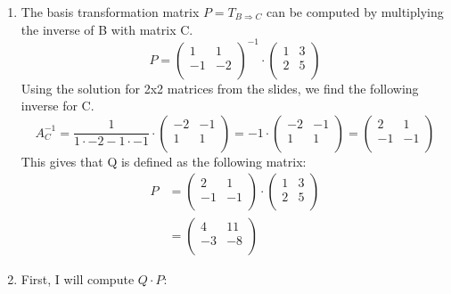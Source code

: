 \documentclass[a4paper]{article}
\begin{document}
\begin{enumerate}
  \item The basis transformation matrix $P = T_{B \Rightarrow C}$ can be computed by multiplying the inverse of B with matrix C.
  \[
  P =
  \left(
  \begin{array}{cc}
  1 & 1 \\
  -1 & -2 \\
  \end{array}
  \right)^{-1}
  \cdot
  \left(
  \begin{array}{cc}
  1 & 3 \\
  2 & 5 \\
  \end{array}
  \right)
  \]
  Using the solution for 2x2 matrices from the slides, we find the following inverse for C.
  \[
  A_C^{-1} =
  \frac{1}{1 \cdot -2 - 1 \cdot -1} \cdot
  \left(
  \begin{array}{cc}
  -2 & -1 \\
  1 & 1 \\
  \end{array}
  \right)
  =
  -1 \cdot
  \left(
  \begin{array}{cc}
  -2 & -1 \\
  1 & 1 \\
  \end{array}
  \right)
  =
  \left(
  \begin{array}{cc}
  2 & 1 \\
  -1 & -1 \\
  \end{array}
  \right)
  \]
  This gives that Q is defined as the following matrix:
  \begin{align*}
  P &=
  \left(
  \begin{array}{cc}
  2 & 1 \\
  -1 & -1 \\
  \end{array}
  \right)
  \cdot
  \left(
  \begin{array}{cc}
  1 & 3 \\
  2 & 5 \\
  \end{array}
  \right) \\
  &=
  \left(
  \begin{array}{cc}
  4 & 11 \\
  -3 & -8 \\
  \end{array}
  \right)
  \end{align*}
  \item First, I will compute $Q \cdot P$:
  \begin{align*}

\end{align*}
\end{enumerate}
\end{document}
